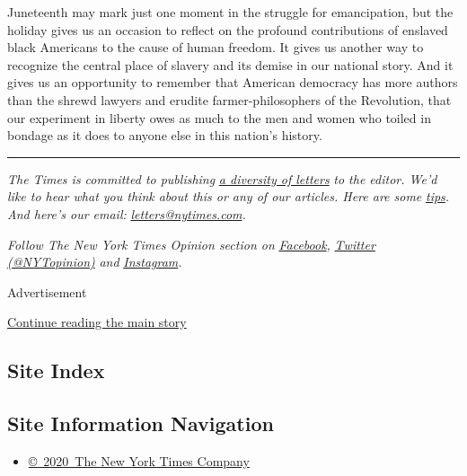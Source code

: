 Juneteenth may mark just one moment in the struggle for emancipation,
but the holiday gives us an occasion to reflect on the profound
contributions of enslaved black Americans to the cause of human freedom.
It gives us another way to recognize the central place of slavery and
its demise in our national story. And it gives us an opportunity to
remember that American democracy has more authors than the shrewd
lawyers and erudite farmer-philosophers of the Revolution, that our
experiment in liberty owes as much to the men and women who toiled in
bondage as it does to anyone else in this nation's history.

\begin{center}\rule{0.5\linewidth}{\linethickness}\end{center}

\emph{The Times is committed to publishing}
\href{https://www.nytimes.com/2019/01/31/opinion/letters/letters-to-editor-new-york-times-women.html}{\emph{a
diversity of letters}} \emph{to the editor. We'd like to hear what you
think about this or any of our articles. Here are some}
\href{https://help.nytimes.com/hc/en-us/articles/115014925288-How-to-submit-a-letter-to-the-editor}{\emph{tips}}\emph{.
And here's our email:}
\href{mailto:letters@nytimes.com}{\emph{letters@nytimes.com}}\emph{.}

\emph{Follow The New York Times Opinion section on}
\href{https://www.facebook.com/nytopinion}{\emph{Facebook}}\emph{,}
\href{http://twitter.com/NYTOpinion}{\emph{Twitter (@NYTopinion)}}
\emph{and}
\href{https://www.instagram.com/nytopinion/}{\emph{Instagram}}\emph{.}

Advertisement

\protect\hyperlink{after-bottom}{Continue reading the main story}

\hypertarget{site-index}{%
\subsection{Site Index}\label{site-index}}

\hypertarget{site-information-navigation}{%
\subsection{Site Information
Navigation}\label{site-information-navigation}}

\begin{itemize}
\tightlist
\item
  \href{https://help.nytimes.com/hc/en-us/articles/115014792127-Copyright-notice}{©~2020~The
  New York Times Company}
\end{itemize}

